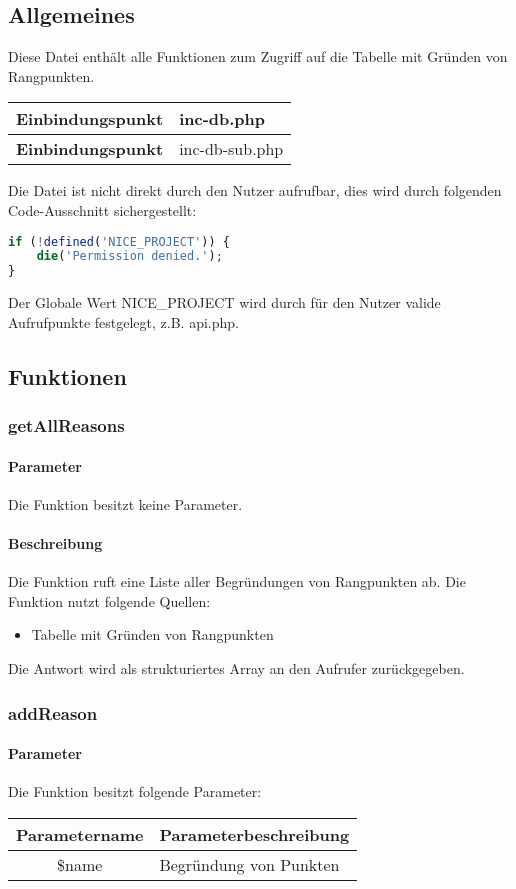 \subsection{Allgemeines} Diese Datei enthält alle Funktionen zum Zugriff auf die Tabelle mit Gründen von Rangpunkten.
\begin{table}[H]
	\begin{tabular}{|c|p{11cm}|}
		\hline
		\textbf{Einbindungspunkt} & inc-db.php \\ \hline
		\textbf{Einbindungspunkt} & inc-db-sub.php \\ \hline
	\end{tabular}
\end{table}
Die Datei ist nicht direkt durch den Nutzer aufrufbar, dies wird durch folgenden Code-Ausschnitt sichergestellt:
\begin{lstlisting}[language=php]
if (!defined('NICE_PROJECT')) {
	die('Permission denied.');
}
\end{lstlisting}
Der Globale Wert {\glqq NICE\_PROJECT\grqq} wird durch für den Nutzer valide Aufrufpunkte festgelegt, z.B. {\glqq api.php\grqq}.
\newpage
\subsection{Funktionen}
\subsubsection{getAllReasons}
\paragraph{Parameter} Die Funktion besitzt keine Parameter.
\paragraph{Beschreibung} Die Funktion ruft eine Liste aller Begründungen von Rangpunkten ab. Die Funktion nutzt folgende Quellen:
\begin{itemize}
	\item Tabelle mit Gründen von Rangpunkten
\end{itemize}
Die Antwort wird als strukturiertes Array an den Aufrufer zurückgegeben.
\subsubsection{addReason}
\paragraph{Parameter} Die Funktion besitzt folgende Parameter:
\begin{table}[H]
	\begin{tabular}{|c|p{11cm}|}
		\hline
		\textbf{Parametername} & \textbf{Parameterbeschreibung} \\ \hline
		\$name & Begründung von Punkten \\ \hline
	\end{tabular}
\end{table}

